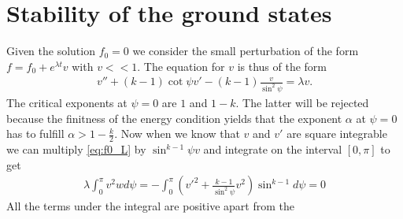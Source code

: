 \section*{Stability of the ground states}

Given the solution $f_0=0$ we consider the small perturbation of the
form $f=f_0+e^{\lambda t} v$ with $v<<1$. The equation for $v$ is thus
of the form
\begin{align}\label{eq:f0_L}
  v''+(k-1)\cot\psi v'-(k-1)\frac{v}{\sin^2\psi}=\lambda v.
\end{align}
The critical exponents at $\psi=0$ are $1$ and $1-k$. The latter will
be rejected because the finitness of the energy condition yields that
the exponent $\alpha$ at $\psi=0$ has to fulfill
$\alpha>1-\frac{k}{2}$. Now when we know that $v$ and $v'$ are square
integrable we can multiply \eqref{eq:f0_L} by $\sin^{k-1}\psi v$ and
integrate on the interval $[0,\pi]$ to get
\begin{align}
  \lambda\int_0^\pi v^2w d\psi=-\int_0^\pi\left(v'^2+\frac{k-1}{\sin^2\psi}v^2\right)\sin^{k-1}d\psi=0
\end{align}
All the terms under the integral are positive apart from the

